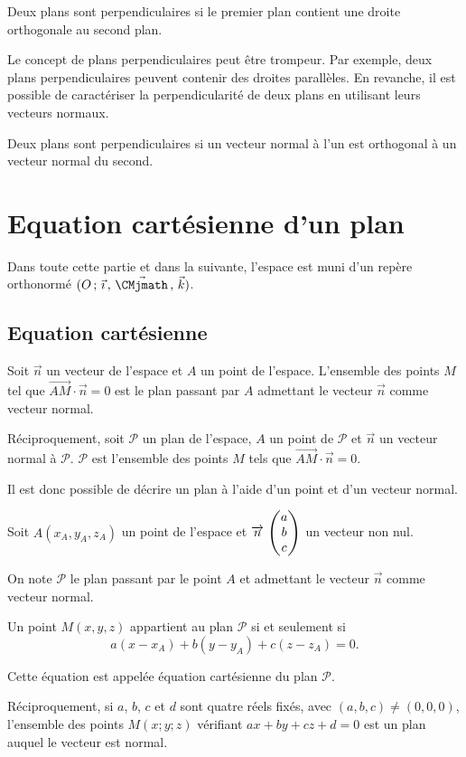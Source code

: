 \documentclass[11pt,fleqn, openany]{book} %
\begin{document}
\begin{definition}Deux plans sont perpendiculaires si le premier plan contient une droite orthogonale au second plan.\end{definition}

Le concept de plans perpendiculaires peut être trompeur. Par exemple, deux plans perpendiculaires peuvent contenir des droites parallèles. En revanche, il est possible de caractériser la perpendicularité de deux plans en utilisant leurs vecteurs normaux.

\begin{proposition} Deux plans sont perpendiculaires si un vecteur normal à l'un est orthogonal à un vecteur normal du second.
\end{proposition}


\newpage

\section{Equation cartésienne d'un plan}

Dans toute cette partie et dans la suivante, l'espace est muni d'un repère orthonormé $\Oijk$.

\subsection{Equation cartésienne}

\begin{proposition}Soit $\vec n$ un vecteur de l'espace et $A$ un point de l'espace. L'ensemble des points $M$ tel que $\overrightarrow{AM}\cdot \vec{n}=0$ est le plan passant par $A$ admettant le vecteur $\vec n$ comme vecteur normal.

Réciproquement, soit $\mathcal{P}$ un plan de l'espace, $A$ un point de $\mathcal{P}$ et $\vec n$ un vecteur normal à $\mathcal{P}$. $\mathcal{P}$ est l'ensemble des points $M$ tels que $\overrightarrow{AM} \cdot \vec n=0$.\end{proposition}

Il est donc possible de décrire un plan à l'aide d'un point et d'un vecteur normal.

\begin{proposition}Soit $A (x_A,y_A,z_A)$ un point de l'espace et $\renewcommand{\arraystretch}{1}\coorde{n}{a}{b}{c}$ un vecteur non nul.

On note $\mathcal{P}$ le plan passant par le point $A$ et admettant le vecteur $\vec n$ comme vecteur normal.

Un point $M(x,y,z)$ appartient au plan $\mathcal{P}$ si et seulement si\[ a(x-x_A)+b(y-y_A)+c(z-z_A)=0.\]

Cette équation est appelée équation cartésienne du plan $\mathcal{P}$.


Réciproquement, si $a$, $b$, $c$ et $d$ sont quatre réels fixés, avec $(a,b,c)\neq (0,0,0)$, l'ensemble des points $M(x;y;z)$ vérifiant $ax+by+cz+d=0$ est un plan auquel le vecteur \renewcommand{\arraystretch}{1} est  normal.\end{proposition}
\end{document}
